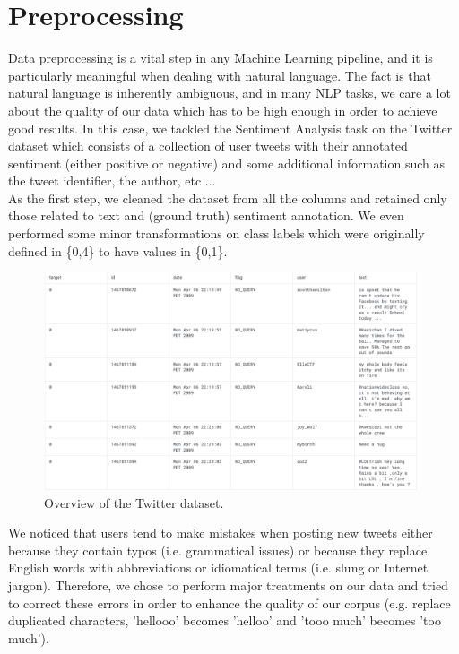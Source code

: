 \section*{Preprocessing}

Data preprocessing is a vital step in any Machine Learning pipeline, and it is particularly meaningful when dealing with natural language. The fact is that natural language is inherently ambiguous, and in many NLP tasks, we care a lot about the quality of our data which has to be high enough in order to achieve good results. In this case, we tackled the Sentiment Analysis task on the Twitter dataset which consists of a collection of user tweets with their annotated sentiment (either positive or negative) and some additional information such as the tweet identifier, the author, etc ...\\

As the first step, we cleaned the dataset from all the columns and retained only those related to text and (ground truth) sentiment annotation. We even performed some minor transformations on class labels which were originally defined in \{0,4\} to have values in \{0,1\}.\\

\begin{figure}[h!t]
    \centering
    \includegraphics[width=11cm]{twitter_overview.png}
    \caption{Overview of the Twitter dataset.}
    \label{fig:TWITTER_OVERVIEW}
\end{figure}

We noticed that users tend to make mistakes when posting new tweets either because they contain typos (i.e. grammatical issues) or because they replace English words with abbreviations or idiomatical terms (i.e. slung or Internet jargon). Therefore, we chose to perform major treatments on our data and tried to correct these errors in order to enhance the quality of our corpus (e.g. replace duplicated characters, 'hellooo' becomes 'helloo' and 'tooo much' becomes 'too much').\\

